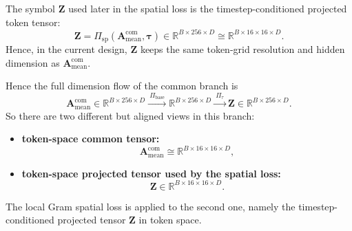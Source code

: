\documentclass[11pt]{article}
\begin{document}
The symbol $\bm{Z}$ used later in the spatial loss is the timestep-conditioned projected token tensor:
\[
  \bm{Z}
  =
  \Pi_{\mathrm{sp}}\!\left(\bm{A}^{\mathrm{com}}_{\mathrm{mean}}, \bm{\tau}\right)
  \in \mathbb{R}^{B\times 256\times D}
  \cong
  \mathbb{R}^{B\times 16\times 16\times D}.
\]
Hence, in the current design, $\bm{Z}$ keeps the same token-grid resolution and hidden dimension as $\bm{A}^{\mathrm{com}}_{\mathrm{mean}}$.

Hence the full dimension flow of the common branch is
\[
  \bm{A}^{\mathrm{com}}_{\mathrm{mean}}
  \in \mathbb{R}^{B\times 256\times D}
  \xrightarrow{\ \Pi_{\mathrm{base}}\ }
  \mathbb{R}^{B\times 256\times D}
  \xrightarrow{\ \Pi_{\tau}\ }
  \bm{Z}
  \in \mathbb{R}^{B\times 256\times D}.
\]
So there are two different but aligned views in this branch:
\begin{itemize}
  \item \textbf{token-space common tensor:}
  \[
    \bm{A}^{\mathrm{com}}_{\mathrm{mean}}
    \cong
    \mathbb{R}^{B\times 16\times 16\times D},
  \]
  \item \textbf{token-space projected tensor used by the spatial loss:}
  \[
    \bm{Z}
    \in
    \mathbb{R}^{B\times 16\times 16\times D}.
  \]
\end{itemize}
The local Gram spatial loss is applied to the second one, namely the timestep-conditioned projected tensor $\bm{Z}$ in token space.
\end{document}
